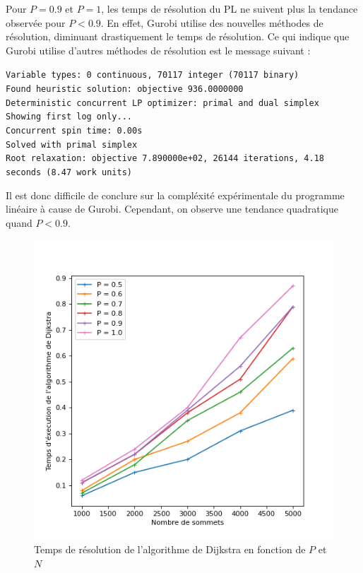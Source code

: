\documentclass{article}
\begin{document}
Pour $P=0.9$ et $P=1$, les temps de résolution du PL ne suivent plus la tendance
observée pour $P<0.9$. En effet, Gurobi utilise des nouvelles méthodes de
résolution, diminuant drastiquement le temps de résolution. Ce qui indique que
Gurobi utilise d'autres méthodes de résolution est le message suivant :
\begin{flushleft}
    \texttt{Variable types: 0 continuous, 70117 integer (70117 binary)}\\
    \texttt{Found heuristic solution: objective 936.0000000}\\

    \texttt{Deterministic concurrent LP optimizer: primal and dual simplex } \\
    \texttt{Showing first log only... } \\
    \texttt{Concurrent spin time: 0.00s} \\

    \texttt{Solved with primal simplex} \\

    \texttt{Root relaxation: objective 7.890000e+02, 26144 iterations, 4.18 seconds (8.47 work units)}
\end{flushleft}

Il est donc difficile de conclure sur la compléxité expérimentale du programme
linéaire à cause de Gurobi. Cependant, on observe une tendance quadratique quand
$P<0.9$.

\begin{figure}[h!]
    \centering
    \includegraphics[scale=0.47]{dij_solving_changing_p.png}{}
    \caption{Temps de résolution de l'algorithme de Dijkstra en fonction de $P$ et $N$}
    \label{dj-time}
\end{figure}
\end{document}
